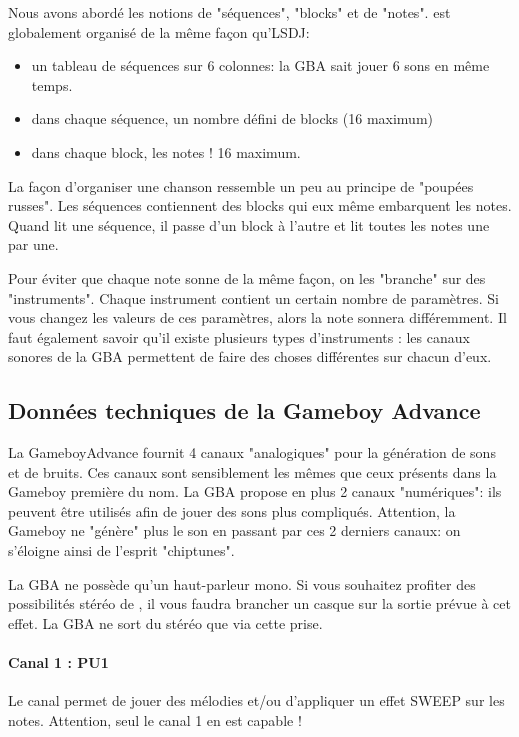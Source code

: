 \documentclass[12pt,a4paper]{article}
\begin{document}
    Nous avons abordé les notions de "séquences", "blocks" et de "notes". \FAT est globalement organisé de la même façon qu'LSDJ:
    \begin{itemize}
        \item{un tableau de séquences sur 6 colonnes: la GBA sait jouer 6 sons en même temps.}
        \item{dans chaque séquence, un nombre défini de blocks (16 maximum)}
        \item{dans chaque block, les notes ! 16 maximum.}
    \end{itemize}\medskip
    
    La façon d'organiser une chanson ressemble un peu au principe de "poupées russes". Les séquences contiennent des blocks qui eux même embarquent les notes. Quand \FAT lit une séquence, il passe d'un block à l'autre et lit toutes les notes une par une.\medskip
    
    Pour éviter que chaque note sonne de la même façon, on les "branche" sur des "instruments". Chaque instrument contient un certain nombre de paramètres. Si vous changez les valeurs de ces paramètres, alors la note sonnera différemment. Il faut également savoir qu'il existe plusieurs types d'instruments : les canaux sonores de la GBA permettent de faire des choses différentes sur chacun d'eux.
    
    \subsection{Données techniques de la Gameboy Advance}
    
    La GameboyAdvance fournit 4 canaux "analogiques" pour la génération de sons et de bruits. Ces canaux sont sensiblement les mêmes que ceux présents dans la Gameboy première du nom. La GBA propose en plus 2 canaux "numériques": ils peuvent être utilisés afin de jouer des sons plus compliqués. Attention, la Gameboy ne "génère" plus le son en passant par ces 2 derniers canaux: on s'éloigne ainsi de l'esprit "chiptunes".
    
    La GBA ne possède qu'un haut-parleur mono. Si vous souhaitez profiter des possibilités stéréo de \FAT, il vous faudra brancher un casque sur la sortie prévue à cet effet. La GBA ne sort du stéréo que via cette prise.
    
        \paragraph{Canal 1 : PU1} Le canal permet de jouer des mélodies et/ou d'appliquer un effet SWEEP sur les notes. Attention, seul le canal 1 en est capable ! 
        
\end{document}
